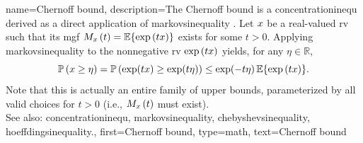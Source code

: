{name={Chernoff bound}, 
	description={The Chernoff bound is a \gls{concentrationinequ} 
		derived as a direct application of \gls{markovsinequality} \cite[Ch.\ 2]{vershynin2018high}. 
		Let $x$ be a real-valued \gls{rv} such that its \gls{mgf} 
		$M_{x}\left(t\right)=\mathbb{E}\{\exp\,(t x)\}$ exists for some $t>0$. 
		Applying \gls{markovsinequality} to the nonnegative 
		\gls{rv} $\exp\,(t x)$ yields, for any $\eta\in\mathbb{R}$, 
		\begin{equation}
			\mathbb{P}\left( x \ge \eta \right)
			= \mathbb{P}\left( \exp(t x) \ge \exp(t\eta)\right)
			\le \exp(-t\eta)\, \mathbb{E}\{\exp\,(t x)\}\nonumber.
		\end{equation}
		Note that this is actually an entire family of upper bounds, parameterized 
		by all valid choices for $t>0$ (i.e., $M_{x}\left(t\right)$ must exist). 
		\\
		See also: \gls{concentrationinequ}, \gls{markovsinequality}, \gls{chebyshevsinequality}, 
		\gls{hoeffdingsinequality}.}, 
 	first={Chernoff bound}, 
 	type=math, 
 	text={Chernoff bound}
}

